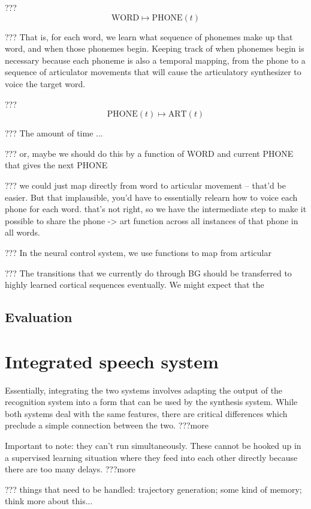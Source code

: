 ??? $$\text{WORD} \mapsto \text{PHONE}(t)$$

??? That is, for each word, we learn
what sequence of phonemes make up that word,
and when those phonemes begin.
Keeping track of when phonemes begin
is necessary because
each phoneme is also a temporal mapping,
from the phone to
a sequence of articulator movements
that will cause the articulatory synthesizer
to voice the target word.

??? $$\text{PHONE}(t) \mapsto \text{ART}(t)$$

??? The amount of time ...

??? or, maybe we should do this by
a function of WORD and current PHONE
that gives the next PHONE

??? we could just map directly from word
to articular movement -- that'd be easier.
But that implausible, you'd have to
essentially relearn how to voice each phone
for each word. that's not right, so we
have the intermediate step to make it
possible to share the phone -> art
function across all instances of that phone
in all words.

??? In the neural control system,
we use functions to map from
articular


??? The transitions that we currently do through
BG should be transferred to highly learned
cortical sequences eventually.
We might expect that the

\subsection{Evaluation}

\section{Integrated speech system}

Essentially, integrating the two systems
involves adapting the output of the recognition system
into a form that can be used by the synthesis system.
While both systems deal with the same features,
there are critical differences
which preclude a simple connection between the two.
???more

Important to note: they can't run simultaneously.
These cannot be hooked up in a supervised learning
situation where they feed into each other
directly because there are too many delays.
???more

??? things that need to be handled:
trajectory generation;
some kind of memory;
think more about this...

